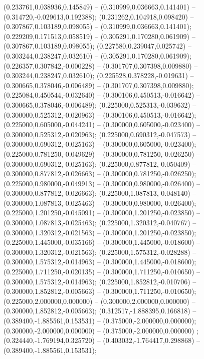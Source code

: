  (0.233761,0.038936,0.145849) -- (0.310999,0.036663,0.141401) -- (0.314720,-0.029613,0.192388);
 (0.231262,0.104918,0.098420) -- (0.307867,0.103189,0.098055) -- (0.310999,0.036663,0.141401);
 (0.229209,0.171513,0.058519) -- (0.305291,0.170280,0.061909) -- (0.307867,0.103189,0.098055);
 (0.227580,0.239047,0.025742) -- (0.303244,0.238247,0.032610) -- (0.305291,0.170280,0.061909);
 (0.226357,0.307842,-0.000228) -- (0.301707,0.307398,0.009880) -- (0.303244,0.238247,0.032610);
 (0.225528,0.378228,-0.019631) -- (0.300665,0.378046,-0.006489) -- (0.301707,0.307398,0.009880);
 (0.225084,0.450544,-0.032640) -- (0.300106,0.450513,-0.016642) -- (0.300665,0.378046,-0.006489);
 (0.225000,0.525313,-0.039632) -- (0.300000,0.525312,-0.020963) -- (0.300106,0.450513,-0.016642);
 (0.225000,0.605000,-0.044241) -- (0.300000,0.605000,-0.023400) -- (0.300000,0.525312,-0.020963);
 (0.225000,0.690312,-0.047573) -- (0.300000,0.690312,-0.025163) -- (0.300000,0.605000,-0.023400);
 (0.225000,0.781250,-0.049629) -- (0.300000,0.781250,-0.026250) -- (0.300000,0.690312,-0.025163);
 (0.225000,0.877812,-0.050409) -- (0.300000,0.877812,-0.026663) -- (0.300000,0.781250,-0.026250);
 (0.225000,0.980000,-0.049913) -- (0.300000,0.980000,-0.026400) -- (0.300000,0.877812,-0.026663);
 (0.225000,1.087813,-0.048140) -- (0.300000,1.087813,-0.025463) -- (0.300000,0.980000,-0.026400);
 (0.225000,1.201250,-0.045091) -- (0.300000,1.201250,-0.023850) -- (0.300000,1.087813,-0.025463);
 (0.225000,1.320312,-0.040767) -- (0.300000,1.320312,-0.021563) -- (0.300000,1.201250,-0.023850);
 (0.225000,1.445000,-0.035166) -- (0.300000,1.445000,-0.018600) -- (0.300000,1.320312,-0.021563);
 (0.225000,1.575312,-0.028288) -- (0.300000,1.575312,-0.014963) -- (0.300000,1.445000,-0.018600);
 (0.225000,1.711250,-0.020135) -- (0.300000,1.711250,-0.010650) -- (0.300000,1.575312,-0.014963);
 (0.225000,1.852812,-0.010706) -- (0.300000,1.852812,-0.005663) -- (0.300000,1.711250,-0.010650);
 (0.225000,2.000000,0.000000) -- (0.300000,2.000000,0.000000) -- (0.300000,1.852812,-0.005663);
 (0.312517,-1.888395,0.166818) -- (0.389400,-1.885561,0.153531) -- (0.375000,-2.000000,0.000000);
 (0.300000,-2.000000,0.000000) -- (0.375000,-2.000000,0.000000) ;
 (0.324440,-1.769194,0.325720) -- (0.403032,-1.764417,0.298868) -- (0.389400,-1.885561,0.153531);
